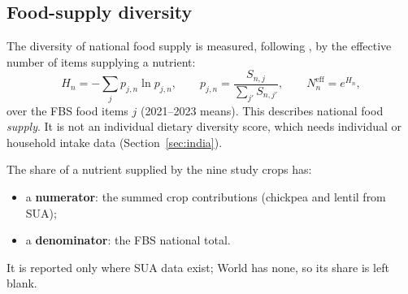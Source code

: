 \subsection{Food-supply diversity}\label{sec:diversitymethod}
The diversity of national food supply is measured, following \citet{remans2014}, by the effective number of
items supplying a nutrient:
\begin{equation}\label{eq:shannon}
H_n = -\sum_j p_{j,n}\ln p_{j,n},\qquad p_{j,n} = \frac{S_{n,j}}{\sum_{j'}S_{n,j'}},\qquad N^{\text{eff}}_n = e^{H_n},
\end{equation}
over the FBS food items $j$ (2021--2023 means). This describes national food \emph{supply}. It is not an
individual dietary diversity score, which needs individual or household intake data
(Section~\ref{sec:india}).

The share of a nutrient supplied by the nine study crops has:
\begin{itemize}
\item a \textbf{numerator}: the summed crop contributions (chickpea and lentil from SUA);
\item a \textbf{denominator}: the FBS national total.
\end{itemize}
It is reported only where SUA data exist; World has none, so its share is left blank.
